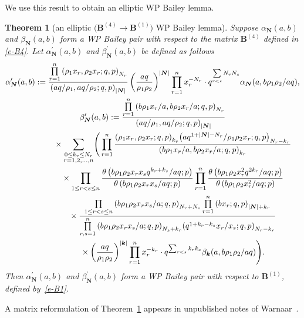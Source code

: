 \documentclass[pdftex]{sigma}
\numberwithin{equation}{section}
\newtheorem{Theorem}{Theorem}[section]
\newenvironment{Remark*}{\begin{remark*}\normalfont}{\end{remark*}}
\newcommand{\sumN}{{\left| \boldsymbol{N} \right|}}
\newcommand\sumk{{\left| \boldsymbol{k} \right|}}
\newcommand{\B}{{ \mathbf B}}
\newcommand{\N}{{ \boldsymbol N}}
\renewcommand{\k}{{ \boldsymbol{k}}}
\newcommand{\multsum}[3]{{\sum\limits_{\substack{{0\le #1_#3 \le #2_#3} \\
{#3 =1,2,\dots, n}}}}}
\newcommand{\triprod}[1]{\prod\limits_{1\le r < s \le #1}}
\newcommand{\sqprod}[1]{\prod\limits_{r, s =1}^{#1}} %
\newcommand{\smallprod}[1]{\prod\limits_{r =1}^{#1}} %
\newcommand{\xover}[1]{#1_{r}/#1_{s}}
\newcommand{\ellipticqrfac}[2]{{\left({#1}; q, p\right)_{#2}}} %
\newcommand{\elliptictheta}[1]{\theta \left({#1} ; p\right) }
\begin{document}
We use this result to obtain an elliptic WP Bailey lemma.

\begin{Theorem}[an elliptic $\big(\B^{(4)} \to\B^{(1)}\big)$ WP Bailey lemma] \label{th:e-WP-BaileyLemma-B4-B1}
Suppose $\alpha_\N(a,b)$ and $\beta_\N(a,b)$ form a WP Bailey pair with respect to the matrix $\B^{(4)}$ defined in \eqref{e-B4}. Let
${\alpha}^{\prime}_\N(a,b)$ and ${\beta}^{\prime}_\N(a,b)$ be defined as follows
\begin{subequations}
\begin{gather}
{\alpha}^{\prime}_\N(a,b) :=
 \frac{\smallprod n \ellipticqrfac{\rho_1x_r, \rho_2x_r}{N_r}}
 {\ellipticqrfac{aq/\rho_1, aq/\rho_2}{\sumN}}
 \left(\frac{aq}{\rho_1\rho_2}\right)^{\sumN}
\smallprod n x_r^{-N_r}\cdot
 q^{\sum\limits_{r<s} N_rN_s}
 \alpha_\N(a, b\rho_1\rho_2/aq), \label{e-alphaprime-B4-B1} \\
{\beta}^{\prime}_\N (a,b) :=
\frac{\smallprod n \ellipticqrfac{b\rho_1x_r/a, b\rho_2x_r/a }{N_r}}
{ \ellipticqrfac{aq/\rho_1, aq/\rho_2}{\sumN}}\nonumber\\
\hphantom{{\beta}^{\prime}_\N (a,b) := }{}
 \times \multsum{k}{N}{r} \Bigg(
\smallprod n \frac{ \ellipticqrfac{\rho_1x_r, \rho_2x_r}{k_r}
\ellipticqrfac{aq^{1+\sumN-N_r}/\rho_1\rho_2 x_r}{N_r-k_r}}
{ \ellipticqrfac{b\rho_1x_r/a, b\rho_2x_r/a}{k_r}}\nonumber\\
\hphantom{{\beta}^{\prime}_\N (a,b) := }{} \times
\triprod n \frac{\elliptictheta{ b\rho_1\rho_2x_rx_sq^{k_r+k_s}/{aq}}}
{\elliptictheta{ b\rho_1\rho_2x_rx_s/{aq}}}
\smallprod n \frac{\elliptictheta{ b\rho_1\rho_2x_r^2q^{2k_r}/{aq}}}
{\elliptictheta{ b\rho_1\rho_2x_r^2/{aq}}} \nonumber\\
\hphantom{{\beta}^{\prime}_\N (a,b) := }{} \times
\frac{\triprod n \ellipticqrfac{b\rho_1\rho_2x_rx_s/a}{N_r+N_s}
\smallprod n \ellipticqrfac{bx_r}{\sumN+k_r}}{\sqprod n \ellipticqrfac{b\rho_1\rho_2x_rx_s/a}{N_s+k_r}
 \ellipticqrfac{q^{1+k_r-k_s}\xover x }{N_r-k_r}}\nonumber\\
\hphantom{{\beta}^{\prime}_\N (a,b) := }{} \times \left(\frac{aq}{\rho_1\rho_2}\right)^{\sumk}
\smallprod n x_r^{-k_r}\cdot q^{\sum_{r<s}k_rk_s}
\beta_\k(a,b\rho_1\rho_2/aq) \Bigg).\label{e-betaprime-B4-B1}
\end{gather}
\end{subequations}
Then ${\alpha}^{\prime}_\N(a,b)$ and ${\beta}^{\prime}_\N(a,b)$ form a WP Bailey pair with respect to $\B^{(1)}$, defined by~\eqref{e-B1}.
\end{Theorem}
 \begin{Remark*}
 A matrix reformulation of Theorem~\ref{th:e-WP-BaileyLemma-B4-B1} appears in unpublished notes of Warnaar~\cite{SOW-notes-2016}.
 \end{Remark*}
\end{document}
